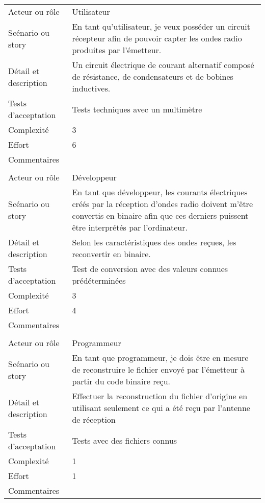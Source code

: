 \begin{longtable}{|l|p{}|}
\hline
    \rowcolor{Gray}
    \multicolumn{2}{|l|}{6} \\
\hline
    Acteur ou rôle & Utilisateur \\
\hline
    Scénario ou story & En tant qu'utilisateur,
          je veux posséder un circuit récepteur afin de pouvoir capter les ondes radio produites par l'émetteur. \\
\hline
    Détail et description & Un circuit électrique de courant alternatif composé de résistance, de condensateurs et de bobines inductives. \\
\hline
    Tests d'acceptation & Tests techniques avec un multimètre \\
\hline
    Complexité & 3 \\
\hline
    Effort & 6 \\
\hline
    Commentaires &  \\

\hline
    \rowcolor{Gray}
    \multicolumn{2}{|l|}{7} \\
\hline
    Acteur ou rôle & Développeur \\
\hline
    Scénario ou story &  En tant que développeur,
          les courants électriques créés par la réception d'ondes radio doivent 
          m'être convertis en binaire afin que ces derniers puissent être interprétés 
          par l'ordinateur. \\
\hline
    Détail et description & Selon les caractéristiques des ondes reçues, les reconvertir en binaire. \\
\hline
    Tests d'acceptation & Test de conversion avec des valeurs connues prédéterminées \\
\hline
    Complexité & 3 \\
\hline
    Effort & 4 \\
\hline
    Commentaires &  \\

\hline
    \rowcolor{Gray}
    \multicolumn{2}{|l|}{8} \\
\hline
    Acteur ou rôle & Programmeur \\
\hline
    Scénario ou story & En tant que programmeur,
          je dois être en mesure de reconstruire le fichier envoyé par l'émetteur à partir du code binaire reçu. \\
\hline
    Détail et description & Effectuer la reconstruction du fichier d'origine en utilisant seulement ce qui a été reçu par l'antenne de réception \\
\hline
    Tests d'acceptation & Tests avec des fichiers connus\\
\hline
    Complexité & 1 \\
\hline
    Effort & 1 \\
\hline
    Commentaires &  \\


\end{longtable}
